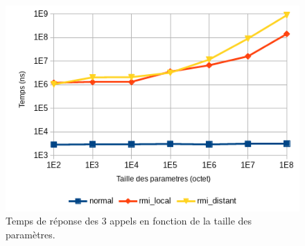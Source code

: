 \documentclass[12pt,letterpaper]{article}
\begin{document}
\begin{figure}[h]
  \centering
  \includegraphics{graph.png}
  \caption{Temps de réponse des 3 appels en fonction de la taille des paramètres.}
  \label{fig:temps}
\end{figure}

\end{document}

